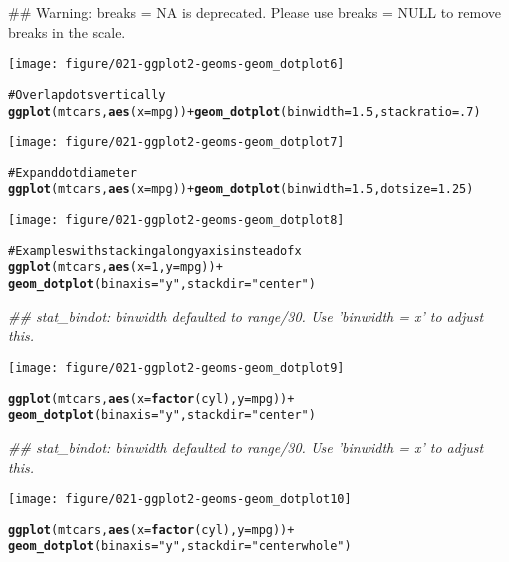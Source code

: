 \documentclass[a4paper,titlepage]{tufte-handout}\usepackage{graphicx, color}
\makeatletter
\def\maxwidth{ %
  \ifdim\Gin@nat@width>\linewidth
    \linewidth
  \else
    \Gin@nat@width
  \fi
}
\newcommand{\hlfunctioncall}[1]{\textcolor[rgb]{0.501960784313725,0,0.329411764705882}{\textbf{#1}}}%
\newcommand{\hlstring}[1]{\textcolor[rgb]{0.6,0.6,1}{#1}}%
\newcommand{\hlcomment}[1]{\textcolor[rgb]{0.180392156862745,0.6,0.341176470588235}{#1}}%
\newenvironment{kframe}{%
 \def\at@end@of@kframe{}%
 \ifinner\ifhmode%
  \def\at@end@of@kframe{\end{minipage}}%
  \begin{minipage}{\columnwidth}%
 \fi\fi%
 \def\FrameCommand##1{\hskip\@totalleftmargin \hskip-\fboxsep
 \colorbox{shadecolor}{##1}\hskip-\fboxsep
     \hskip-\linewidth \hskip-\@totalleftmargin \hskip\columnwidth}%
 \MakeFramed {\advance\hsize-\width
   \@totalleftmargin\z@ \linewidth\hsize
   \@setminipage}}%
 {\par\unskip\endMakeFramed%
 \at@end@of@kframe}
\newenvironment{knitrout}{}{} %
\makeatother
\begin{document}
\begin{knitrout}
\begin{kframe}
{\ttfamily\noindent\textcolor{warningcolor}{\#\# Warning: breaks = NA is deprecated. Please use breaks = NULL to remove breaks in the scale.}}\end{kframe}\texttt{[image: figure/021-ggplot2-geoms-geom\_dotplot6]} \begin{kframe}\begin{alltt}
\hlcomment{# Overlap dots vertically}
\hlfunctioncall{ggplot}(mtcars, \hlfunctioncall{aes}(x = mpg)) + \hlfunctioncall{geom_dotplot}(binwidth = 1.5, stackratio = .7)
\end{alltt}
\end{kframe}\texttt{[image: figure/021-ggplot2-geoms-geom\_dotplot7]} \begin{kframe}\begin{alltt}
\hlcomment{# Expand dot diameter}
\hlfunctioncall{ggplot}(mtcars, \hlfunctioncall{aes}(x  =mpg)) + \hlfunctioncall{geom_dotplot}(binwidth = 1.5, dotsize = 1.25)
\end{alltt}
\end{kframe}\texttt{[image: figure/021-ggplot2-geoms-geom\_dotplot8]} \begin{kframe}\begin{alltt}
\hlcomment{# Examples with stacking along y axis instead of x}
\hlfunctioncall{ggplot}(mtcars, \hlfunctioncall{aes}(x = 1, y = mpg)) +
  \hlfunctioncall{geom_dotplot}(binaxis = \hlstring{"y"}, stackdir = \hlstring{"center"})
\end{alltt}


{\ttfamily\noindent\itshape\textcolor{messagecolor}{\#\# stat\_bindot: binwidth defaulted to range/30. Use 'binwidth = x' to adjust this.}}\end{kframe}\texttt{[image: figure/021-ggplot2-geoms-geom\_dotplot9]} \begin{kframe}\begin{alltt}
\hlfunctioncall{ggplot}(mtcars, \hlfunctioncall{aes}(x = \hlfunctioncall{factor}(cyl), y = mpg)) +
  \hlfunctioncall{geom_dotplot}(binaxis = \hlstring{"y"}, stackdir = \hlstring{"center"})
\end{alltt}


{\ttfamily\noindent\itshape\textcolor{messagecolor}{\#\# stat\_bindot: binwidth defaulted to range/30. Use 'binwidth = x' to adjust this.}}\end{kframe}\texttt{[image: figure/021-ggplot2-geoms-geom\_dotplot10]} \begin{kframe}\begin{alltt}
\hlfunctioncall{ggplot}(mtcars, \hlfunctioncall{aes}(x = \hlfunctioncall{factor}(cyl), y = mpg)) +
  \hlfunctioncall{geom_dotplot}(binaxis = \hlstring{"y"}, stackdir = \hlstring{"centerwhole"})
\end{alltt}



\end{kframe}
\end{knitrout}
\end{document}
